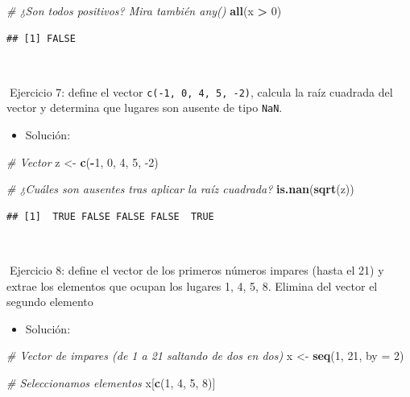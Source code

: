\documentclass[11pt,]{book}
\newenvironment{Shaded}{\begin{snugshade}}{\end{snugshade}}
\newcommand{\CommentTok}[1]{\textcolor[rgb]{0.37,0.37,0.37}{\textit{#1}}}
\newcommand{\DataTypeTok}[1]{\textcolor[rgb]{0.27,0.27,0.27}{#1}}
\newcommand{\DecValTok}[1]{\textcolor[rgb]{0.06,0.06,0.06}{#1}}
\newcommand{\KeywordTok}[1]{\textcolor[rgb]{0.27,0.27,0.27}{\textbf{#1}}}
\newcommand{\NormalTok}[1]{#1}
\newcommand{\OperatorTok}[1]{\textcolor[rgb]{0.43,0.43,0.43}{\textbf{#1}}}
\newcommand{\StringTok}[1]{\textcolor[rgb]{0.5,0.5,0.5}{#1}}
\providecommand{\tightlist}{%
  \setlength{\itemsep}{0pt}\setlength{\parskip}{0pt}}
\begin{document}
\begin{Shaded}
\begin{Highlighting}[]
\CommentTok{# ¿Son todos positivos? Mira también any()}
\KeywordTok{all}\NormalTok{(x }\OperatorTok{>}\StringTok{ }\DecValTok{0}\NormalTok{)}
\end{Highlighting}
\end{Shaded}

\begin{verbatim}
## [1] FALSE
\end{verbatim}

~

📝Ejercicio 7: define el vector \texttt{c(-1,\ 0,\ 4,\ 5,\ -2)}, calcula la raíz cuadrada del vector y determina que lugares son ausente de tipo \texttt{NaN}.

\begin{itemize}
\tightlist
\item
  Solución:
\end{itemize}

\begin{Shaded}
\begin{Highlighting}[]
\CommentTok{# Vector}
\NormalTok{z <-}\StringTok{ }\KeywordTok{c}\NormalTok{(}\OperatorTok{-}\DecValTok{1}\NormalTok{, }\DecValTok{0}\NormalTok{, }\DecValTok{4}\NormalTok{, }\DecValTok{5}\NormalTok{, }\DecValTok{-2}\NormalTok{)}

\CommentTok{# ¿Cuáles son ausentes tras aplicar la raíz cuadrada?}
\KeywordTok{is.nan}\NormalTok{(}\KeywordTok{sqrt}\NormalTok{(z))}
\end{Highlighting}
\end{Shaded}

\begin{verbatim}
## [1]  TRUE FALSE FALSE FALSE  TRUE
\end{verbatim}

~

📝Ejercicio 8: define el vector de los primeros números impares (hasta el 21) y extrae los elementos que ocupan los lugares 1, 4, 5, 8. Elimina del vector el segundo elemento

\begin{itemize}
\tightlist
\item
  Solución:
\end{itemize}

\begin{Shaded}
\begin{Highlighting}[]
\CommentTok{# Vector de impares (de 1 a 21 saltando de dos en dos)}
\NormalTok{x <-}\StringTok{ }\KeywordTok{seq}\NormalTok{(}\DecValTok{1}\NormalTok{, }\DecValTok{21}\NormalTok{, }\DataTypeTok{by =} \DecValTok{2}\NormalTok{)}

\CommentTok{# Seleccionamos elementos}
\NormalTok{x[}\KeywordTok{c}\NormalTok{(}\DecValTok{1}\NormalTok{, }\DecValTok{4}\NormalTok{, }\DecValTok{5}\NormalTok{, }\DecValTok{8}\NormalTok{)]}
\end{Highlighting}
\end{Shaded}
\end{document}
